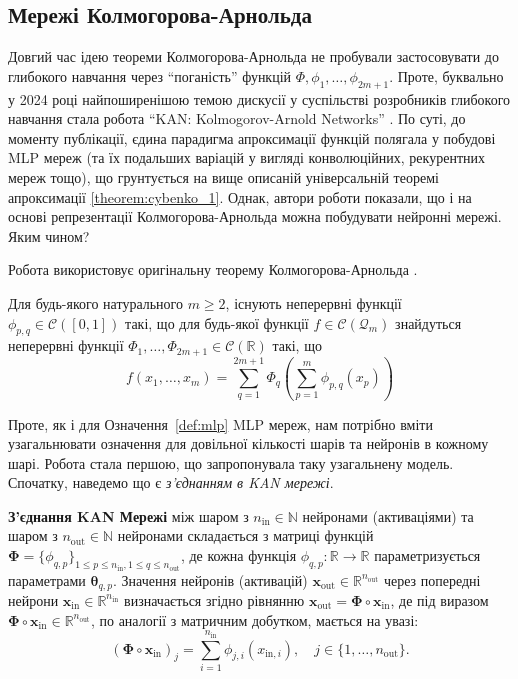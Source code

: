 \subsection{Мережі Колмогорова-Арнольда}

Довгий час ідею теореми Колмогорова-Арнольда не пробували застосовувати до
глибокого навчання через ``поганість'' функцій $\Phi,\phi_1,\dots,\phi_{2m+1}$.
Проте, буквально у 2024 році найпоширенішою темою дискусії у суспільстві
розробників глибокого навчання стала робота ``KAN: Kolmogorov-Arnold Networks''
\cite{kan}. По суті, до моменту публікації, єдина парадигма апроксимації функцій
полягала у побудові MLP мереж (та їх подальших варіацій у вигляді конволюційних,
рекурентних мереж тощо), що грунтується на вище описаній універсальній теоремі
апроксимації \ref{theorem:cybenko_1}. Однак, автори роботи \cite{kan} показали,
що і на основі репрезентації Колмогорова-Арнольда можна побудувати нейронні
мережі. Яким чином?

Робота \cite{kan} використовує оригінальну теорему Колмогорова-Арнольда \cite{kolmogorov-original}.
\begin{definition}
	Для будь-якого натурального $m \geq 2$, існують неперервні функції
	$\phi_{p,q} \in \mathcal{C}([0,1])$ такі, що для будь-якої функції $f \in
	\mathcal{C}(\mathcal{Q}_m)$ знайдуться неперервні функції
	$\Phi_1,\dots,\Phi_{2m+1} \in \mathcal{C}(\mathbb{R})$ такі, що
	\begin{equation*}
		f(x_1,\dots,x_m) = \sum_{q=1}^{2m+1}\Phi_q\left(\sum_{p=1}^m \phi_{p,q}(x_p)\right)
	\end{equation*}
\end{definition}

Проте, як і для Означення~\ref{def:mlp} MLP мереж, нам потрібно вміти узагальнювати
означення для довільної кількості шарів та нейронів в кожному шарі. Робота 
\cite{kan} стала першою, що запропонувала таку узагальнену модель. Спочатку,
наведемо що є \textit{з'єднанням в KAN мережі}.

\begin{definition}
	\textbf{З'єднання KAN Мережі} між шаром з $n_{\text{in}} \in \mathbb{N}$
	нейронами (активаціями) та шаром з $n_{\text{out}} \in \mathbb{N}$ нейронами
	складається з матриці функцій $\boldsymbol{\Phi} = \{\phi_{q,p}\}_{1\leq
	p\leq n_{\text{in}}, 1 \leq q \leq n_{\text{out}}}$, де кожна функція
	$\phi_{q,p}: \mathbb{R} \to \mathbb{R}$ параметризується параметрами
	$\boldsymbol{\theta}_{q,p}$. Значення нейронів (активацій)
	$\mathbf{x}_{\text{out}} \in \mathbb{R}^{n_{\text{out}}}$ через попередні
	нейрони $\mathbf{x}_{\text{in}} \in \mathbb{R}^{n_{\text{in}}}$ визначається
	згідно рівнянню $\mathbf{x}_{\text{out}} = \boldsymbol{\Phi} \circ
	\mathbf{x}_{\text{in}}$, де під виразом $\boldsymbol{\Phi} \circ
	\mathbf{x}_{\text{in}} \in \mathbb{R}^{n_{\text{out}}}$, по аналогії з
	матричним добутком, мається на увазі:
	\begin{equation*}
		(\boldsymbol{\Phi} \circ \mathbf{x}_{\text{in}})_j = \sum_{i=1}^{n_{\text{in}}}\phi_{j,i}(x_{\text{in},i}), \quad j \in \{1,\dots,n_{\text{out}}\}.
	\end{equation*}
\end{definition}

